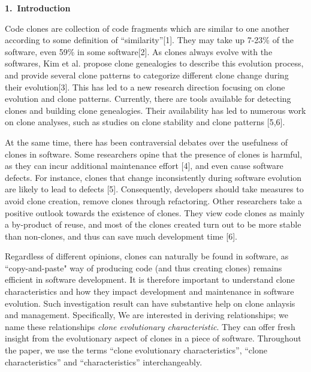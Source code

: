 \begin{center}{\large\bf 1.\ Introduction}\end{center}

Code clones are collection of code fragments which are similar to one another according to some definition of ``similarity''[1]. They may take up 7-23\% of the software, even 59\% in some software[2]. %
As clones always evolve with the softwares, Kim et al. propose clone genealogies to describe this evolution process, and provide several clone patterns to categorize different clone change during their evolution[3]. This has led to a new research direction focusing on clone evolution and clone patterns. Currently, there are tools available for detecting clones and building clone genealogies. Their availability has led to numerous work on clone analyses, such as studies on clone stability and clone patterns [5,6]. %

At the same time, there has been contraversial debates over the usefulness of clones in software. Some researchers opine that the presence of clones is harmful, as they can incur additional maintenance effort [4], and even cause software defects. For instance, clones that change inconsistently during software evolution are likely to lead to defects [5]. Consequently, developers should take measures to avoid clone creation, remove clones through refactoring. Other researchers take a positive outlook towards the existence of clones. They view code clones as mainly a by-product of reuse, and most of the clones created turn out to be more stable than non-clones, and thus can save much development time [6]. 

Regardless of different opinions, clones can naturally be found in software, as ``copy-and-paste" way of producing code (and thus creating clones) remains efficient in software development. It is therefore important to understand clone characteristics and how they impact development and maintenance in software evolution. Such investigation result can have substantive help on clone anlaysis and management.    Specifically, 
We are interested in deriving relationships; we name these relationships {\em clone evolutionary characteristic}. 
They can offer fresh insight from the evolutionary aspect of clones in a piece of software. Throughout the paper, we use the terms ``clone evolutionary characteristics'', ``clone characteristics'' and ``characteristics'' interchangeably.  

